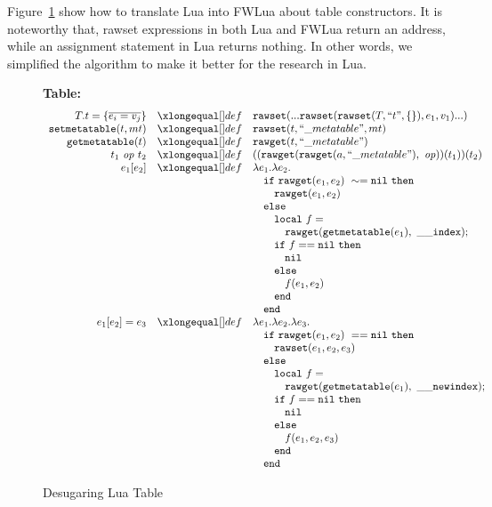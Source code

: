 
Figure~\ref{fig:desLuaTable} show how to translate Lua into FWLua about table constructors. It is noteworthy that, rawset expressions in both Lua and FWLua return an address, while an assignment statement in Lua returns nothing. In other words, we simplified the algorithm to make it better for the research in Lua.

\begin{figure}
\caption{Desugaring Lua Table}\label{fig:desLuaTable}
{\bf Table:}\[
\begin{array}{rclcl}
\desugar{T.t = \{\overline{e_i = v_j}\}}{{\tt rawset}(...{\tt rawset}({\tt rawset}(T,``t", \{\}), e_1, v_1)...)}
\desugar{{\tt setmetatable}(t, mt)}{{\tt rawset}(t,``\_metatable", mt)}
\desugar{{\tt getmetatable}(t)}{{\tt rawget}(t,``\_metatable")}
\desugar{t_1~{\it op}~t_2}{(({\tt rawget}({\tt rawget}(a,``\_metatable"),~{\it op}))(t_1))(t_2)}
\desugar{e_1[e_2]}{\lambda e_1.\lambda e_2.}
\desugarline{ 
     \quad{\tt if}~ {\tt rawget}(e_1, e_2) ~\sim= {\tt nil} ~ {\tt then}\\
     \quad\quad{\tt rawget}(e_1, e_2) ~\\
     \quad{\tt else}\\
     \quad\quad{\tt local}~f = \\
     \quad\quad\quad {\tt rawget}({\tt getmetatable}(e_1),~{\tt{\_}{\_}index});\\
     \quad\quad{\tt if}~ f == {\tt nil} ~ {\tt then}\\
     \quad\quad\quad {\tt nil} \\
     \quad\quad{\tt else}\\
     \quad\quad\quad f(e_1,e_2)\\ 
     \quad\quad{\tt end}\\
     \quad{\tt end}\\
     }
\desugar{e_1[e_2]=e_3}{
    \lambda e_1.\lambda e_2.\lambda e_3.
}
\desugarline{  
     \quad{\tt if}~  {\tt rawget}(e_1, e_2) ~== {\tt nil} ~ {\tt then}\\
     \quad\quad{\tt rawset}(e_1, e_2,e_3) ~\\
     \quad{\tt else}\\
     \quad\quad{\tt local}~f = \\
     \quad\quad\quad{\tt rawget}({\tt getmetatable}(e_1),~{\tt{\_}{\_}newindex});\\
     \quad\quad{\tt if}~ f == {\tt nil} ~ {\tt then}\\
     \quad\quad\quad {\tt nil} \\
     \quad\quad{\tt else}\\
     \quad\quad\quad f(e_1,e_2,e_3)\\ 
     \quad\quad{\tt end}\\
     \quad{\tt end}\\
}
\end{array}\]
\end{figure}

